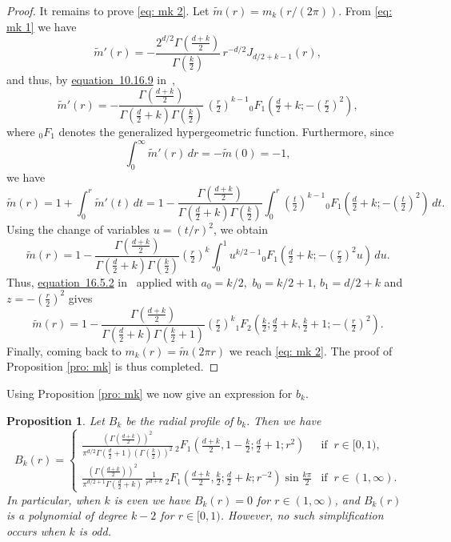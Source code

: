 \documentclass[a4paper,12pt,reqno]{amsart}
\numberwithin{equation}{section}
\newtheorem{proposition}[theorem]{Proposition}
\theoremstyle{definition}
\newcommand{\tm}{\tilde{m}}
\begin{document}
\begin{proof}
It remains to prove \eqref{eq: mk 2}.  Let $\tm(r)=m_k(r/(2\pi))$. From \eqref{eq: mk 1} we have 
\[
    \tm'(r) = -\frac{2^{d/2} \Gamma(\frac{d + k}{2})}{\Gamma(\frac{k}{2})}\, r^{-d/2} J_{d/2 + k - 1}(r) ,
\]
and thus, by \href{https://dlmf.nist.gov/10.16.E9}{equation~10.16.9} in~\cite{dlmf},
\[
 \tm'(r) = -\frac{\Gamma(\frac{d + k}{2})}{\Gamma(\frac{d}{2} + k) \Gamma(\frac{k}{2})}  \, (\tfrac{r}{2})^{k - 1} {_0F_1}(\tfrac{d}{2} + k; -(\tfrac{r}{2})^2),
\]
where $_0F_1$ denotes the generalized hypergeometric function. Furthermore, since 
\[
 \int_0^\infty \tm'(r) \, dr = -\tm(0) =  -1 , 
\]
we have
\begin{equation*}
 \tm(r) = 1 + \int_0^r \tm'(t) \, dt = 1- \frac{\Gamma(\frac{d + k}{2})}{\Gamma(\frac{d}{2} + k) \Gamma(\frac{k}{2})} \int_{0}^r (\tfrac{t}{2})^{k - 1} {_0F_1}(\tfrac{d}{2} + k; -(\tfrac{t}{2})^2) \, dt.
\end{equation*}
Using the change of variables $u= (t/r)^2$, we obtain
\begin{equation*}
\tm(r)=1-\frac{\Gamma(\frac{d + k}{2})}{\Gamma(\frac{d}{2} + k)\Gamma(\frac{k}{2})}(\tfrac{r}{2})^{k}\int_{0}^1 u^{k/2 - 1} {_0F_1}(\tfrac{d}{2} + k; -(\tfrac{r}{2})^2u) \, du.
\end{equation*}
Thus, \href{https://dlmf.nist.gov/16.5.E2}{equation~16.5.2} in~\cite{dlmf} applied with $a_0=k/2,$ $b_0=k/2+1$, $b_1=d/2+k$ and $z=-(\tfrac{r}{2})^2$ gives
\[
    \tm(r)=1-\frac{\Gamma(\frac{d + k}{2})}{\Gamma(\frac{d}{2} + k)\Gamma(\frac{k}{2}+1)}(\tfrac{r}{2})^k {_1F_2}(\tfrac{k}{2}; \tfrac{d}{2} + k, \tfrac{k}{2} + 1; -(\tfrac{r}{2})^2).
\]
Finally, coming back to $m_k(r)=\tm(2\pi r)$ we reach \eqref{eq: mk 2}. The proof of Proposition \ref{pro: mk} is thus completed.







\end{proof}


Using  Proposition \ref{pro: mk} we now give an expression for $b_k.$ 
\begin{proposition}
\label{pro: B_k}
    Let $B_k$ be the radial profile of $b_k.$ Then we have
\[
 B_k(r) = \begin{cases}
  \displaystyle
  \frac{(\Gamma(\frac{d + k}{2}))^2}{\pi^{d/2} \Gamma(\frac{d}{2} + 1) (\Gamma(\frac{k}{2}))^2} \, {_2F_1}(\tfrac{d + k}{2}, 1 - \tfrac{k}{2}; \tfrac{d}{2} + 1; r^2) & \text{if } \ r \in [0, 1), \\[1.2em]
  \displaystyle
  \frac{(\Gamma(\frac{d + k}{2}))^2}{\pi^{d/2 + 1} \Gamma(\frac{d}{2} + k)} \, \frac{1}{r^{d + k}} \, {_2F_1}(\tfrac{d + k}{2}, \tfrac{k}{2}; \tfrac{d}{2} + k; r^{-2}) \sin \tfrac{k \pi}{2} & \text{if } \ r \in (1, \infty).
 \end{cases}
\]
In particular, when $k$ is even we have $B_k(r) = 0$ for $r \in (1, \infty)$, and $B_k(r)$ is a polynomial of degree $k-2$ for $r \in [0, 1)$. However, no such simplification occurs when $k$ is odd.
\end{proposition}
\end{document}
